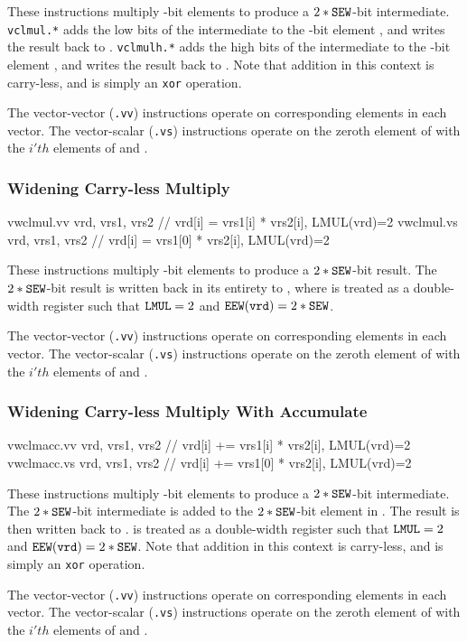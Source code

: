 These instructions multiply \SEW-bit elements
to produce a $2*{\tt SEW}$-bit intermediate.
{\tt vclmul.*} adds the low \SEW bits of the intermediate to the
\SEW-bit element \vrd, and writes the result back to \vrd.
{\tt vclmulh.*} adds the high \SEW bits of the intermediate to the
\SEW-bit element \vrd, and writes the result back to \vrd.
Note that addition in this context is carry-less, and is simply an {\tt xor}
operation.

The vector-vector ({\tt *.vv}) instructions operate on corresponding
elements in each vector.
The vector-scalar ({\tt *.vs}) instructions operate on the zeroth
element of  with the $i'th$ elements of  and \vrd.


\subsubsection{Widening Carry-less Multiply}
\label{sec:vector:clmul:widening}

\begin{cryptoisa}
vwclmul.vv  vrd, vrs1, vrs2 // vrd[i] = vrs1[i] * vrs2[i], LMUL(vrd)=2
vwclmul.vs  vrd, vrs1, vrs2 // vrd[i] = vrs1[0] * vrs2[i], LMUL(vrd)=2
\end{cryptoisa}

These instructions multiply \SEW-bit elements
to produce a $2*{\tt SEW}$-bit result.
The $2*{\tt SEW}$-bit result is written back in its entirety to \vrd,
where \vrd is treated as a double-width register such that
${\tt LMUL}=2$ and ${\tt EEW}({\tt vrd})=2*{\tt SEW}$.

The vector-vector ({\tt *.vv}) instructions operate on corresponding
elements in each vector.
The vector-scalar ({\tt *.vs}) instructions operate on the zeroth
element of  with the $i'th$ elements of  and \vrd.


\subsubsection{Widening Carry-less Multiply With Accumulate}
\label{sec:vector:clmul:widening}

\begin{cryptoisa}
vwclmacc.vv vrd, vrs1, vrs2 // vrd[i] += vrs1[i] * vrs2[i], LMUL(vrd)=2
vwclmacc.vs vrd, vrs1, vrs2 // vrd[i] += vrs1[0] * vrs2[i], LMUL(vrd)=2
\end{cryptoisa}

These instructions multiply \SEW-bit elements
to produce a $2*{\tt SEW}$-bit intermediate.
The $2*{\tt SEW}$-bit intermediate is added to the $2*{\tt SEW}$-bit element in \vrd.
The result is then written back to \vrd.
\vrd is treated as a double-width register such that
${\tt LMUL}=2$ and ${\tt EEW}({\tt vrd})=2*{\tt SEW}$.
Note that addition in this context is carry-less, and is simply an {\tt xor}
operation.

The vector-vector ({\tt *.vv}) instructions operate on corresponding
elements in each vector.
The vector-scalar ({\tt *.vs}) instructions operate on the zeroth
element of  with the $i'th$ elements of  and \vrd.

